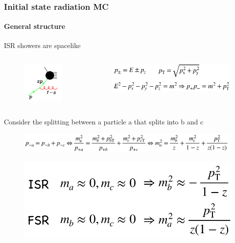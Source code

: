 \documentclass[aspectratio=43]{beamer}
\begin{document}
\begin{frame}

	\frametitle{Initial state radiation MC}
	\framesubtitle{General structure}
	
	\center \footnotesize ISR showers are spacelike
	\begin{columns}
		
		
		\begin{figure}
			\includegraphics[width = 2 cm]{plots/ISR_shower0.png}
		\end{figure}
	
		
		\begin{figure}
			\includegraphics[width = 5 cm]{plots/ISR_spacelike.png}
		\end{figure}
		
	\end{columns}

	\vspace{0.5cm}
	\footnotesize Consider the splitting between a particle a that splits into b and c
	
	\begin{figure}
		\includegraphics[width = 9 cm]{plots/ISR_splitting.png}
	\end{figure}

	\begin{figure}
		\includegraphics[width = 4.5 cm]{plots/ISR_FSR.png}
	\end{figure}

\end{frame}
\end{document}
